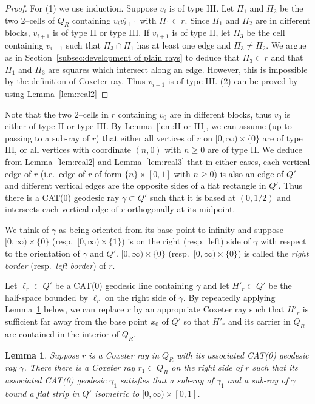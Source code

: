 \documentclass[11pt]{amsart}
\newtheorem{lemma}[theorem]{Lemma}
\theoremstyle{definition}
\begin{document}
\begin{proof}
	For (1) we use induction. Suppose $v_i$ is of type III. Let $\Pi_1$ and $\Pi_2$ be the two $2$--cells of $Q_R$ containing $\overline{v_iv_{i+1}}$ with $\Pi_1\subset r$. Since $\Pi_1$ and $\Pi_2$ are in different blocks, $v_{i+1}$ is of type II or type III. If $v_{i+1}$ is of type II, let $\Pi_3$ be the cell containing $v_{i+1}$ such that $\Pi_3\cap\Pi_1$ has at least one edge and $\Pi_3\neq\Pi_2$. We argue as in Section~\ref{subsec:development of plain rays} to deduce that $\Pi_3\subset r$ and that $\Pi_1$ and $\Pi_3$ are squares which intersect along an edge. However, this is impossible by the definition of Coxeter ray. Thus $v_{i+1}$ is of type III. (2) can be proved by using Lemma~\ref{lem:real2}
\end{proof}

Note that the two $2$--cells in $r$ containing $v_0$ are in different blocks, thus $v_0$ is either of type II or type III. By Lemma~\ref{lem:II or III}, we can assume (up to passing to a sub-ray of $r$) that either all vertices of $r$ on $[0,\infty)\times\{0\}$ are of type III, or all vertices with coordinate $(n,0)$ with $n\ge 0$ are of type II. We deduce from Lemma~\ref{lem:real2} and Lemma~\ref{lem:real3} that in either cases, each vertical edge of $r$ (i.e.\ edge of $r$ of form $\{n\}\times[0,1]$ with $n\ge 0$) is also an edge of $Q'$ and different vertical edges are the opposite sides of a flat rectangle in $Q'$. Thus there is a CAT(0) geodesic ray $\gamma\subset Q'$ such that it is based at $(0,1/2)$ and intersects each vertical edge of $r$ orthogonally at its midpoint. 

We think of $\gamma$ as being oriented from its base point to infinity and suppose $[0,\infty)\times\{0\}$ (resp.\ $[0,\infty)\times\{1\}$) is on the right (resp.\ left) side of $\gamma$ with respect to the orientation of $\gamma$ and $Q'$. $[0,\infty)\times\{0\}$ (resp.\ $[0,\infty)\times\{0\}$) is called the \emph{right border} (resp.\ \emph{left border}) of $r$.

Let $\ell_r\subset Q'$ be a CAT(0) geodesic line containing $\gamma$ and let $H'_r\subset Q'$ be the half-space bounded by $\ell_r$ on the right side of $\gamma$. By repeatedly applying Lemma~\ref{lem:parallel transport} below, we can replace $r$ by an appropriate Coxeter ray such that $H'_r$ is sufficient far away from the base point $x_0$ of $Q'$ so that $H'_r$ and its carrier in $Q_R$ are contained in the interior of $Q_R$.

\begin{lemma}
	\label{lem:parallel transport}
	Suppose $r$ is a Coxeter ray in $Q_R$ with its associated CAT(0) geodesic ray $\gamma$. There there is a Coxeter ray $r_1\subset Q_R$ on the right side of $r$ such that its associated CAT(0) geodesic $\gamma_1$ satisfies that a sub-ray of $\gamma_1$ and a sub-ray of $\gamma$ bound a flat strip in $Q'$ isometric to $[0,\infty)\times[0,1]$.
\end{lemma}
\end{document}
